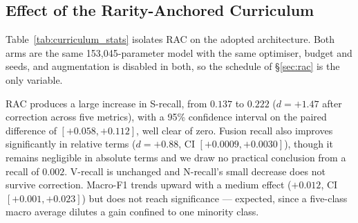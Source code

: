 \documentclass[journal,twoside,web]{ieeecolor}
\begin{document}
\subsection{Effect of the Rarity-Anchored Curriculum}
\label{sec:results_curriculum}
Table~\ref{tab:curriculum_stats} isolates RAC on the adopted architecture. Both arms are the same 153,045-parameter model with the same optimiser, budget and seeds, and augmentation is disabled in both, so the schedule of \S\ref{sec:rac} is the only variable.

\begin{table}[!t]
\caption{\textbf{Secondary outcome.} RAC vs.\ natural-distribution sampling, PC-WavKAN, 20 paired seeds, DS2. Augmentation disabled in both arms. $\Delta$ and $d$ are RAC minus no-RAC; $p$ is Holm-adjusted across the five metrics.}
\label{tab:curriculum_stats}
\centering
\footnotesize
{}
\end{table}

RAC produces a large increase in S-recall, from $0.137$ to $0.222$ ($d=+1.47$ after correction across five metrics), with a 95\% confidence interval on the paired difference of $[+0.058,+0.112]$, well clear of zero. Fusion recall also improves significantly in relative terms ($d=+0.88$, CI $[+0.0009,+0.0030]$), though it remains negligible in absolute terms and we draw no practical conclusion from a recall of $0.002$. V-recall is unchanged and N-recall's small decrease does not survive correction. Macro-F1 trends upward with a medium effect ($+0.012$, CI $[+0.001,+0.023]$) but does not reach significance --- expected, since a five-class macro average dilutes a gain confined to one minority class.
\end{document}
